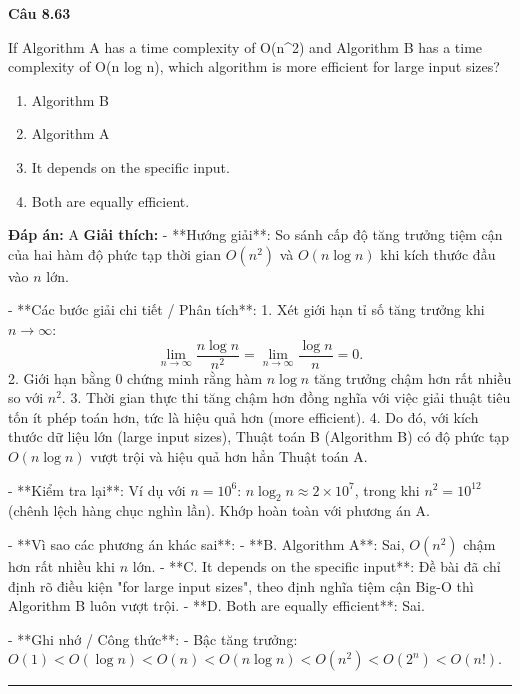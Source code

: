\documentclass[11pt,a4paper]{article}
\newenvironment{question}[1]{%
  \par\vspace{1em}\noindent\textbf{\large Câu #1}\par\vspace{0.4em}
}{%
  \par\vspace{1em}\hrule\vspace{0.6em}
}
\newenvironment{choices}{%
  \begin{enumerate}[label=\textbf{\Alph*.},leftmargin=2.2em,itemsep=2pt,topsep=3pt]
}{%
  \end{enumerate}
}
\newcommand{\choice}{\item}
\begin{document}
\begin{question}{8.63}
If Algorithm A has a time complexity of O(n^2) and Algorithm B has a time complexity of O(n log n), which algorithm is more efficient for large input sizes?
\begin{choices}
\choice Algorithm B
\choice Algorithm A
\choice It depends on the specific input.
\choice Both are equally efficient.
\end{choices}
\textbf{Đáp án:} A
\textbf{Giải thích:} - **Hướng giải**:
  So sánh cấp độ tăng trưởng tiệm cận của hai hàm độ phức tạp thời gian \(O(n^2)\) và \(O(n \log n)\) khi kích thước đầu vào \(n\) lớn.

- **Các bước giải chi tiết / Phân tích**:
  1. Xét giới hạn tỉ số tăng trưởng khi \(n \rightarrow \infty\):
     \[ \lim_{n \to \infty} \frac{n \log n}{n^2} = \lim_{n \to \infty} \frac{\log n}{n} = 0. \]
  2. Giới hạn bằng 0 chứng minh rằng hàm \(n \log n\) tăng trưởng chậm hơn rất nhiều so với \(n^2\).
  3. Thời gian thực thi tăng chậm hơn đồng nghĩa với việc giải thuật tiêu tốn ít phép toán hơn, tức là hiệu quả hơn (more efficient).
  4. Do đó, với kích thước dữ liệu lớn (large input sizes), Thuật toán B (Algorithm B) có độ phức tạp \(O(n \log n)\) vượt trội và hiệu quả hơn hẳn Thuật toán A.

- **Kiểm tra lại**:
  Ví dụ với \(n = 10^6\): \(n \log_2 n \approx 2 \times 10^7\), trong khi \(n^2 = 10^{12}\) (chênh lệch hàng chục nghìn lần).
  Khớp hoàn toàn với phương án A.

- **Vì sao các phương án khác sai**:
  - **B. Algorithm A**: Sai, \(O(n^2)\) chậm hơn rất nhiều khi \(n\) lớn.
  - **C. It depends on the specific input**: Đề bài đã chỉ định rõ điều kiện "for large input sizes", theo định nghĩa tiệm cận Big-O thì Algorithm B luôn vượt trội.
  - **D. Both are equally efficient**: Sai.

- **Ghi nhớ / Công thức**:
  - Bậc tăng trưởng: \(O(1) < O(\log n) < O(n) < O(n \log n) < O(n^2) < O(2^n) < O(n!)\).
\end{question}
\end{document}
